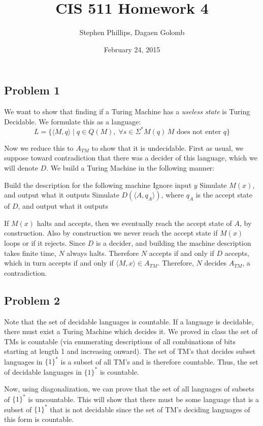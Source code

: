 \documentclass[english]{article}
\title{CIS 511 Homework 4}
\author{Stephen Phillips, Dagaen Golomb}
\date{February 24, 2015}
\begin{document}
\maketitle
\subsection*{Problem 1}
We want to show that finding if a Turing Machine has a \textit{useless state}
is Turing Decidable. We formulate this as a language:
\[ L = \{ \langle M, q \rangle \mid
   q \in Q(M), \;
   \forall s \in \Sigma^* M(q) \, M\textrm{ does not enter }q \} \]

Now we reduce this to $A_{TM}$ to show that it is undecidable. First as usual, 
we suppose toward contradiction that there was a decider of this language, which
we will denote $D$. We build a Turing Machine in the following manner:
\begin{algorithmic}
\State Build the description for the following machine
		\State Ignore input $y$
		\State Simulate $M(x)$, and output what it outputs
	\EndFunction
\State Simulate $D(\langle A, q_A \rangle)$, where $q_A$ is the accept state
		of $D$, and output what it outputs
\EndFunction 
\end{algorithmic}

If $M(x)$ halts and accepts, then we eventually reach the accept state of $A$,
by construction. Also by construction we never reach the accept state if $M(x)$
loops or if it rejects. Since $D$ is a decider, and building the machine
description takes finite time, $N$ always halts. Therefore $N$ accepts if and
only if $D$ accepts, which in turn accepts if and only if
$\langle M,x \rangle \in A_{TM}$. Therefore, $N$ decides $A_{TM}$, a
contradiction. 

\subsection*{Problem 2}
Note that the set of decidable languages is countable. If a language is decidable,
there must exist a Turing Machine which decides it. We proved in class the set of
TMs is countable (via enumerating descriptions of all combinations of bits starting
at length 1 and increasing onward). The set of TM's that decides subset languages in $\{1\}^*$
is a subset of all TM's and is therefore countable. Thus, the set of decidable languages
in $\{1\}^*$ is countable.

Now, using diagonalization, we can prove that the set of all languages of subsets of $\{1\}^*$
is uncountable. This will show that there must be some language that is a subset of $\{1\}^*$ that
is not decidable since the set of TM's deciding languages of this form is countable.
\end{document}
